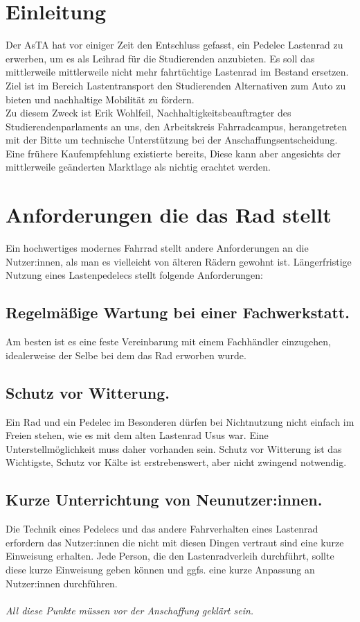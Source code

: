\documentclass[a4paper,ngerman, 14pt] {scrartcl}
\begin{document}
\tableofcontents
\newpage
\section{Einleitung}
Der AsTA hat vor einiger Zeit den Entschluss gefasst, ein Pedelec Lastenrad zu erwerben, um es als Leihrad für die Studierenden anzubieten. Es soll das mittlerweile mittlerweile nicht mehr fahrtüchtige Lastenrad im Bestand ersetzen. Ziel ist im Bereich Lastentransport den Studierenden Alternativen zum Auto zu bieten und nachhaltige Mobilität zu fördern.\\
Zu diesem Zweck ist Erik Wohlfeil, Nachhaltigkeitsbeauftragter des Studierendenparlaments an uns, den Arbeitskreis Fahrradcampus, herangetreten mit der Bitte um technische Unterstützung bei der Anschaffungsentscheidung. Eine frühere Kaufempfehlung existierte bereits, Diese kann aber angesichts der mittlerweile geänderten Marktlage als nichtig erachtet werden.\\


\section{Anforderungen die das Rad stellt}
Ein hochwertiges modernes Fahrrad stellt andere Anforderungen an die Nutzer:innen, als man es vielleicht von älteren Rädern gewohnt ist. Längerfristige Nutzung eines Lastenpedelecs stellt folgende Anforderungen:\\

\subsection{Regelmäßige Wartung bei einer Fachwerkstatt.} Am besten ist es eine feste Vereinbarung mit einem Fachhändler einzugehen, idealerweise der Selbe bei dem das Rad erworben wurde.

\subsection{Schutz vor Witterung.} Ein Rad und ein Pedelec im Besonderen dürfen bei Nichtnutzung nicht einfach im Freien stehen, wie es mit dem alten Lastenrad Usus war. Eine Unterstellmöglichkeit muss daher vorhanden sein. Schutz vor Witterung ist das Wichtigste, Schutz vor Kälte ist erstrebenswert, aber nicht zwingend notwendig.

\subsection{Kurze Unterrichtung von Neunutzer:innen.} Die Technik eines Pedelecs und das andere Fahrverhalten eines Lastenrad erfordern das Nutzer:innen die nicht mit diesen Dingen vertraut sind eine kurze Einweisung erhalten. Jede Person, die den Lastenradverleih durchführt, sollte diese kurze Einweisung geben können und ggfs. eine kurze Anpassung an Nutzer:innen durchführen.\\
\vspace{2mm}\\
\textit{All diese Punkte müssen vor der Anschaffung geklärt sein.}
\end{document}
